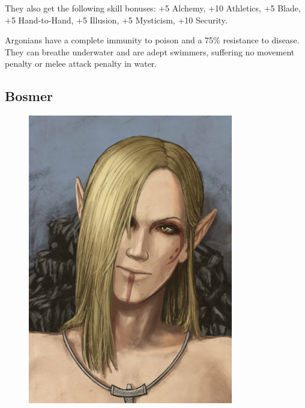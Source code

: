 \documentclass[12pt]{book}
\begin{document}
They also get the following skill bonuses: +5 Alchemy, +10 Athletics, +5 Blade, +5 Hand-to-Hand, +5 Illusion, +5 Mysticism, +10 Security.

Argonians have a complete immunity to poison and a 75\% resistance to disease. They can breathe underwater and are adept swimmers, suffering no movement penalty or melee attack penalty in water.\\

\subsection{Bosmer}
\begin{figure}
	\includegraphics[width=\textwidth]{Bosmer.png}
\end{figure}
\end{document}
